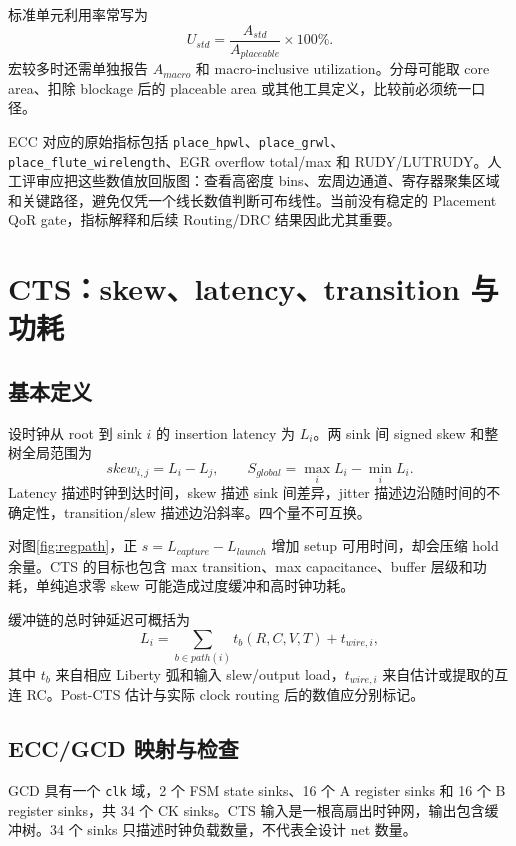 \documentclass[UTF8,a4paper,11pt,fontset=fandol]{ctexart}
\numberwithin{equation}{section}
\newcommand{\code}[1]{\nolinkurl{#1}}
\begin{document}
标准单元利用率常写为
\begin{equation}
U_{std}=\frac{A_{std}}{A_{placeable}}\times100\%.
\end{equation}
宏较多时还需单独报告 $A_{macro}$ 和 macro-inclusive utilization。分母可能取 core area、扣除 blockage 后的 placeable area 或其他工具定义，比较前必须统一口径。

ECC 对应的原始指标包括 \code{place_hpwl}、\code{place_grwl}、\code{place_flute_wirelength}、EGR overflow total/max 和 RUDY/LUTRUDY。人工评审应把这些数值放回版图：查看高密度 bins、宏周边通道、寄存器聚集区域和关键路径，避免仅凭一个线长数值判断可布线性。当前没有稳定的 Placement QoR gate，指标解释和后续 Routing/DRC 结果因此尤其重要。

\section{CTS：skew、latency、transition 与功耗}

\subsection{基本定义}

设时钟从 root 到 sink $i$ 的 insertion latency 为 $L_i$。两 sink 间 signed skew 和整树全局范围为
\begin{equation}
skew_{i,j}=L_i-L_j,\qquad
S_{global}=\max_iL_i-\min_iL_i.
\end{equation}
Latency 描述时钟到达时间，skew 描述 sink 间差异，jitter 描述边沿随时间的不确定性，transition/slew 描述边沿斜率。四个量不可互换。

对图\ref{fig:regpath}，正 $s=L_{capture}-L_{launch}$ 增加 setup 可用时间，却会压缩 hold 余量。CTS 的目标也包含 max transition、max capacitance、buffer 层级和功耗，单纯追求零 skew 可能造成过度缓冲和高时钟功耗\cite{enics,weste}。

缓冲链的总时钟延迟可概括为
\begin{equation}
L_i=\sum_{b\in path(i)}t_b(R,C,V,T)+t_{wire,i},
\end{equation}
其中 $t_b$ 来自相应 Liberty 弧和输入 slew/output load，$t_{wire,i}$ 来自估计或提取的互连 RC。Post-CTS 估计与实际 clock routing 后的数值应分别标记。

\subsection{ECC/GCD 映射与检查}

GCD 具有一个 \code{clk} 域，2 个 FSM state sinks、16 个 A register sinks 和 16 个 B register sinks，共 34 个 CK sinks。CTS 输入是一根高扇出时钟网，输出包含缓冲树。34 个 sinks 只描述时钟负载数量，不代表全设计 net 数量。
\end{document}
